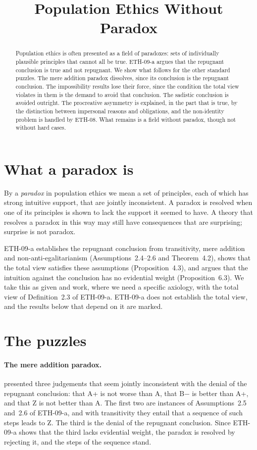 \documentclass{situationist-preprint}
\title{Population Ethics Without Paradox}
\begin{document}
\maketitle

\begin{abstract}
Population ethics is often presented as a field of paradoxes: sets of individually plausible principles that cannot all be true. ETH-09-a argues that the repugnant conclusion is true and not repugnant. We show what follows for the other standard puzzles. The mere addition paradox dissolves, since its conclusion is the repugnant conclusion. The impossibility results lose their force, since the condition the total view violates in them is the demand to avoid that conclusion. The sadistic conclusion is avoided outright. The procreative asymmetry is explained, in the part that is true, by the distinction between impersonal reasons and obligations, and the non-identity problem is handled by ETH-08. What remains is a field without paradox, though not without hard cases.
\end{abstract}

\section{What a paradox is}

By a \emph{paradox} in population ethics we mean a set of principles, each of which has strong intuitive support, that are jointly inconsistent. A paradox is resolved when one of its principles is shown to lack the support it seemed to have. A theory that resolves a paradox in this way may still have consequences that are surprising; surprise is not paradox.

ETH-09-a establishes the repugnant conclusion from transitivity, mere addition and non-anti-egalitarianism (Assumptions~2.4--2.6 and Theorem~4.2), shows that the total view satisfies these assumptions (Proposition~4.3), and argues that the intuition against the conclusion has no evidential weight (Proposition~6.3). We take this as given and work, where we need a specific axiology, with the total view of Definition~2.3 of ETH-09-a. ETH-09-a does not establish the total view, and the results below that depend on it are marked.

\section{The puzzles}

\paragraph{The mere addition paradox.} \citet[ch.~19]{Parfit1984} presented three judgements that seem jointly inconsistent with the denial of the repugnant conclusion: that A+ is not worse than A, that B$-$ is better than A+, and that Z is not better than A. The first two are instances of Assumptions~2.5 and~2.6 of ETH-09-a, and with transitivity they entail that a sequence of such steps leads to Z. The third is the denial of the repugnant conclusion. Since ETH-09-a shows that the third lacks evidential weight, the paradox is resolved by rejecting it, and the steps of the sequence stand.
\end{document}
